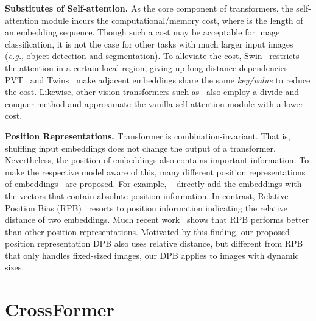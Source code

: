 \documentclass{article} \usepackage{iclr2022_conference,times}
\newcommand{\eg}{{\emph{e.g.}}}
\begin{document}
\textbf{Substitutes of Self-attention.} As the core component of transformers, the self-attention module incurs the  computational/memory cost, where  is the length of an embedding sequence.
Though such a cost may be acceptable for image classification, it is not the case for other tasks with much larger input images (\eg, object detection and segmentation).
To alleviate the cost, Swin~\citep{DBLP:journals/corr/abs-2103-14030} restricts the attention in a certain local region, giving up long-distance dependencies. PVT~\citep{DBLP:journals/corr/abs-2102-12122} and Twins~\citep{DBLP:journals/corr/abs-2104-13840} make adjacent embeddings share the same \textit{key/value} to reduce the cost.
Likewise, other vision transformers such as~\citep{DBLP:journals/corr/abs-2103-14899,DBLP:journals/corr/abs-2105-12723,DBLP:journals/corr/abs-2103-15808} also employ a divide-and-conquer method and approximate the vanilla self-attention module with a lower cost.

\textbf{Position Representations.} Transformer is combination-invariant. That is, shuffling input embeddings does not change the output of a transformer. Nevertheless, the position of embeddings also contains important information.
To make the respective model aware of this, many different position representations of embeddings~\citep{DBLP:conf/nips/VaswaniSPUJGKP17} are proposed. For example, ~\citet{DBLP:conf/iclr/DosovitskiyB0WZ21} directly add the embeddings with the vectors that contain absolute position information. In contrast, Relative Position Bias (RPB)~\citep{DBLP:conf/naacl/ShawUV18} resorts to position information indicating the relative distance of two embeddings.
Much recent work~\citep{DBLP:journals/corr/abs-2103-14030,DBLP:journals/corr/abs-2106-02689} shows that RPB performs better than other position representations. Motivated by this finding, our proposed position representation DPB also uses relative distance, but different from RPB that only handles fixed-sized images, our DPB applies to images with dynamic sizes.

\vspace{-4mm}
\section{CrossFormer}
\vspace{-3mm}
\end{document}
